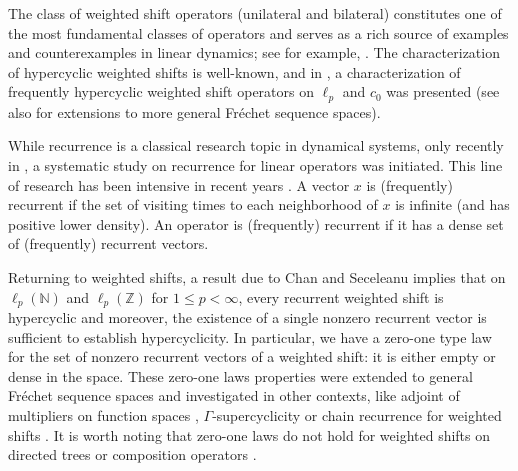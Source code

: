 \documentclass[11pt]{amsart}
\begin{document}
The class of weighted shift operators (unilateral and bilateral) constitutes one of the most fundamental classes of operators and serves as a rich source of examples and counterexamples in linear dynamics; see for example, \cite{BayGri07,BayRuz15,Bes16,BonGro18,ChaErnMen16,charpentier2019chaos}. The characterization of hypercyclic weighted shifts is well-known, and in \cite{BayRuz15}, a characterization of frequently hypercyclic weighted shift operators on \(\ell_p\) and \(c_0\) was presented (see also \cite{BonGro18,charpentier2019chaos} for extensions to more general Fréchet sequence spaces).

While recurrence is a classical research topic in  dynamical systems, only recently in \cite{CosManPar14}, a systematic study on recurrence for linear operators was initiated. This line of research has been intensive in recent years \cite{abakumov2024orbits,BonGroLopPer22JFA,CardeMur22,CardeMur22multipleScand,GriLop23,GriLop25,lopez2024recurrent,LopMen25}. A vector \( x \) is (frequently) recurrent if the set of visiting times to each neighborhood of \( x \) is infinite (and has positive lower density). An operator is (frequently) recurrent if it has a dense set of (frequently) recurrent vectors.

Returning to weighted shifts, a result due to Chan and Seceleanu \cite{ChaSec12} implies that on \(\ell_p(\mathbb{N})\) and \(\ell_p(\mathbb{Z})\) for \(1 \leq p < \infty\), every recurrent weighted shift is hypercyclic and moreover, the existence of a single nonzero recurrent vector is sufficient to establish hypercyclicity. In particular, we have a zero-one type law for the set of nonzero recurrent vectors of a weighted shift: it is either empty or dense in the space. These zero-one laws properties  were extended to general Fr\'echet sequence spaces \cite{bonilla2025zeroEdinburgh,he2018jf-class} and investigated in other contexts, like adjoint of multipliers on function spaces \cite{ChSe10,bonilla2025zeroEdinburgh},   $\Gamma$-supercyclicity \cite{abakumov2024orbits} or chain recurrence for weighted shifts \cite{lopez2025shifts}. It is worth noting that zero-one laws do not hold for weighted shifts on directed trees \cite{abakumov2024several} or composition operators \cite{ChSe10}. 

\end{document}
